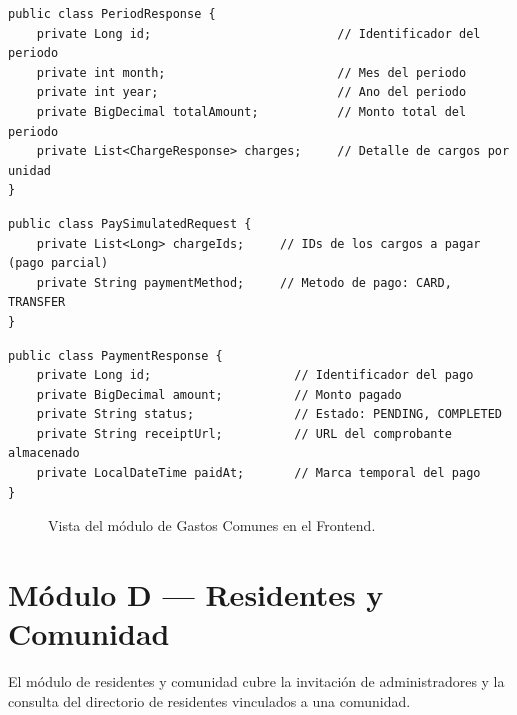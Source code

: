 \begin{lstlisting}[style=javadto, title={\texttt{PeriodResponse}}]
public class PeriodResponse {
    private Long id;                          // Identificador del periodo
    private int month;                        // Mes del periodo
    private int year;                         // Ano del periodo
    private BigDecimal totalAmount;           // Monto total del periodo
    private List<ChargeResponse> charges;     // Detalle de cargos por unidad
}
\end{lstlisting}

\begin{lstlisting}[style=javadto, title={\texttt{PaySimulatedRequest}}]
public class PaySimulatedRequest {
    private List<Long> chargeIds;     // IDs de los cargos a pagar (pago parcial)
    private String paymentMethod;     // Metodo de pago: CARD, TRANSFER
}
\end{lstlisting}

\begin{lstlisting}[style=javadto, title={\texttt{PaymentResponse}}]
public class PaymentResponse {
    private Long id;                    // Identificador del pago
    private BigDecimal amount;          // Monto pagado
    private String status;              // Estado: PENDING, COMPLETED
    private String receiptUrl;          // URL del comprobante almacenado
    private LocalDateTime paidAt;       // Marca temporal del pago
}
\end{lstlisting}

\begin{figure}[H]
  \centering
  \caption{Vista del módulo de Gastos Comunes en el Frontend.}
  \label{fig:anexo-gastos-frontend}
\end{figure}

\section{Módulo D --- Residentes y Comunidad}

El módulo de residentes y comunidad cubre la invitación de administradores y la consulta del directorio de residentes vinculados a una comunidad.

